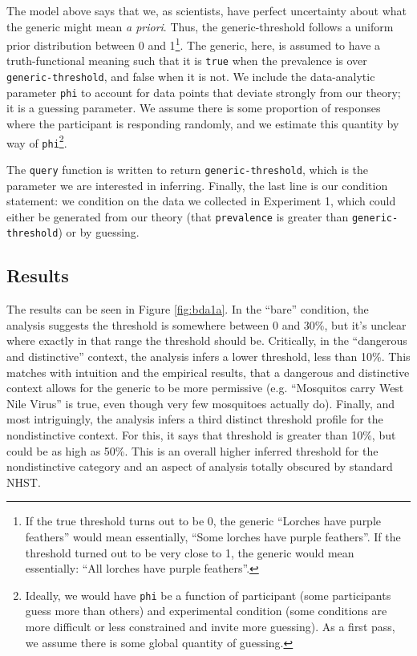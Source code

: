 \documentclass[10pt,letterpaper]{article}
\begin{document}
The model above says that we, as scientists, have perfect uncertainty about what the generic might mean \emph{a priori}. Thus, the generic-threshold follows a uniform prior distribution between 0 and 1\footnote{If the true threshold turns out to be 0, the generic ``Lorches have purple feathers'' would mean essentially, ``Some lorches have purple feathers''. If the threshold turned out to be very close to 1, the generic would mean essentially: ``All lorches have purple feathers''.}. The generic, here, is assumed to have a truth-functional meaning such that it is \lstinline{true} when the prevalence is over \lstinline{generic-threshold}, and false when it is not. We include the data-analytic parameter \lstinline{phi} to account for data points that deviate strongly from our theory; it is a guessing parameter. We assume there is some proportion of responses where the participant is responding randomly, and we estimate this quantity by way of \lstinline{phi}\footnote{Ideally, we would have \lstinline{phi} be a function of participant (some participants guess more than others) and experimental condition (some conditions are more difficult or less constrained and invite more guessing). As a first pass, we assume there is some global quantity of guessing.}.

The \lstinline{query} function is written to return \lstinline{generic-threshold}, which is the parameter we are interested in inferring. Finally, the last line is our condition statement: we condition on the data we collected in Experiment 1, which could either be generated from our theory (that \lstinline{prevalence} is greater than \lstinline{generic-threshold}) or by guessing. 

\subsection{Results}

The results can be seen in Figure \ref{fig:bda1a}. In the ``bare'' condition, the analysis suggests the threshold is somewhere between 0 and 30\%, but it's unclear where exactly in that range the threshold should be. Critically, in the ``dangerous and distinctive'' context, the analysis infers a lower threshold, less than 10\%. This matches with intuition and the empirical results, that a dangerous and distinctive context allows for the generic to be more permissive (e.g. ``Mosquitos carry West Nile Virus'' is true, even though very few mosquitoes actually do). Finally, and most intriguingly, the analysis infers a third distinct threshold profile for the nondistinctive context.  For this, it says that threshold is greater than 10\%, but could be as high as 50\%. This is an overall higher inferred threshold for the nondistinctive category and an aspect of analysis totally obscured by standard NHST. 
\end{document}

